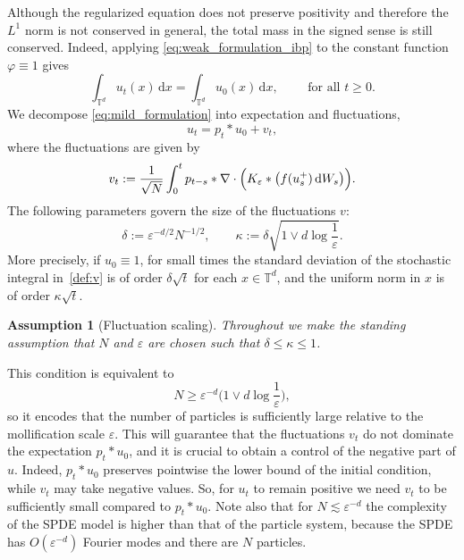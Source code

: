 \documentclass[a4paper,12pt]{article}
\newcommand{\assign}{:=}
\newcommand{\mathd}{\mathrm{d}}
\newtheorem{assumption}{Assumption}
\newcommand{\T}{\mathbb{T}}
\begin{document}
Although the regularized equation does not preserve positivity and
therefore the $L^1$ norm is not conserved in general, the total mass in the
signed sense is still conserved. Indeed, applying \eqref{eq:weak_formulation_ibp} to the
constant function $\varphi\equiv 1$ gives
\[
    \int_{\mathbb{T}^d} u_t(x)\,\mathd x
    =
    \int_{\mathbb{T}^d} u_0(x)\,\mathd x, \qquad \text{ for all } t\geq 0.
\]
We decompose \eqref{eq:mild_formulation} into expectation and fluctuations,
\begin{equation}\label{eq:v-def}
    u_t = p_t \ast u_0 + v_t,
\end{equation}
where the fluctuations are given by
\begin{equation}\label{def:v}
    v_t := \frac{1}{\sqrt N}\int_0^t
    p_{t-s} * \nabla\cdot\Bigl(K_\varepsilon * \bigl(f(u_s^+)\,\mathrm{d}W_s\bigr)\Bigr).
\end{equation}
The following parameters govern the size of the fluctuations $v$:
\begin{equation}
    \delta \assign \varepsilon^{- d / 2} N^{- 1 / 2}, \qquad \kappa \assign
     \delta \sqrt{1\vee d \log \frac{1}{\varepsilon}} .
\end{equation}
More precisely, if $u_0 \equiv 1$, for small times the standard deviation of the stochastic integral in~\eqref{def:v} is of order $\delta \sqrt{t}$ for each $x \in \T^d$,  and the uniform norm in $x$ is of order $\kappa \sqrt{t}$.

\begin{assumption}[Fluctuation scaling]\label{ass:kappa}
    Throughout we make the standing assumption that \(N\) and \(\varepsilon\) are chosen such that $\delta \leq \kappa \leq 1$.
\end{assumption}
This condition is equivalent to 
\begin{equation}\label{kappa_condition}
    N \geq \varepsilon^{-d} \big(1\vee d\log \frac{1}{\varepsilon}\big) ,
\end{equation}
so it encodes that the number of particles is sufficiently large relative to the mollification scale $\varepsilon$. This will guarantee that the fluctuations $v_t$ do not dominate the expectation $p_t \ast u_0$, and it is crucial to obtain a control of the negative part of $u$. Indeed, $p_t \ast u_0$ preserves pointwise the lower bound of the initial condition, while $v_t$ may take negative values. So, for $u_t$ to remain positive we need $v_t$ to be sufficiently small compared to $p_t \ast u_0$. Note also that for $N \lesssim \varepsilon^{-d}$ the complexity of the SPDE model is higher than that of the particle system, because the SPDE has $O(\varepsilon^{-d})$ Fourier modes and there are $N$ particles.
\end{document}
